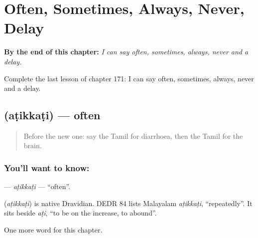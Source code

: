 
\chapter{Often, Sometimes, Always, Never, Delay}
\label{ch:ta-often-sometimes-always-never-delay}

\begin{chapteropening}
\textbf{By the end of this chapter:} \emph{I can say often, sometimes, always, never and a delay.}

Complete the last lesson of chapter 171: I can say often, sometimes, always, never and a delay.
\end{chapteropening}

\section[\texorpdfstring{\ta{அடிக்கடி} (aṭikkaṭi)}{அடிக்கடி (aṭikkaṭi)}]{ (aṭikkaṭi) — often}

\label{lesson:TA-C171-atikkati}



\begin{quote}
Before the new one: say the Tamil for diarrhoea, then the Tamil for the brain.
\end{quote}

\subsection*{You'll want to know: }
\textbf{} — \emph{aṭikkaṭi} — \textquotedblleft{}often\textquotedblright{}.

\begin{cousinweb}
\textbf{} (\emph{aṭikkaṭi}) is native Dravidian. DEDR 84 lists Malayalam \emph{aṭikkaṭi}, \textquotedblleft{}repeatedly\textquotedblright{}. It sits beside \emph{aṭi}, \textquotedblleft{}to be on the increase, to abound\textquotedblright{}.
\end{cousinweb}

\begin{grammarlens}[title={What you've built}]
One more word for this chapter.
\end{grammarlens}

